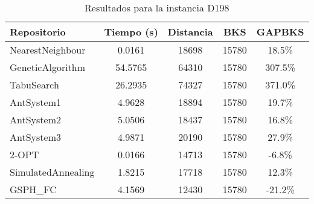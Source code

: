 \begin{table}[H]
\centering
\caption{Resultados para la instancia D198}
\begin{tabular}{|l|c|c|c|c|}
\hline
\textbf{Repositorio} & \textbf{Tiempo (s)} & \textbf{Distancia} & \textbf{BKS} & \textbf{GAPBKS} \\ 
\hline
NearestNeighbour & 0.0161 & 18698 & 15780 & 18.5\% \\ 
GeneticAlgorithm & 54.5765 & 64310 & 15780 & 307.5\% \\ 
TabuSearch & 26.2935 & 74327 & 15780 & 371.0\% \\ 
AntSystem1 & 4.9628 & 18894 & 15780 & 19.7\% \\ 
AntSystem2 & 5.0506 & 18437 & 15780 & 16.8\% \\ 
AntSystem3 & 4.9871 & 20190 & 15780 & 27.9\% \\ 
2-OPT & 0.0166 & 14713 & 15780 & -6.8\% \\ 
SimulatedAnnealing & 1.8215 & 17718 & 15780 & 12.3\% \\ 
GSPH_FC & 4.1569 & 12430 & 15780 & -21.2\% \\ 
\hline
\end{tabular}
\end{table}
